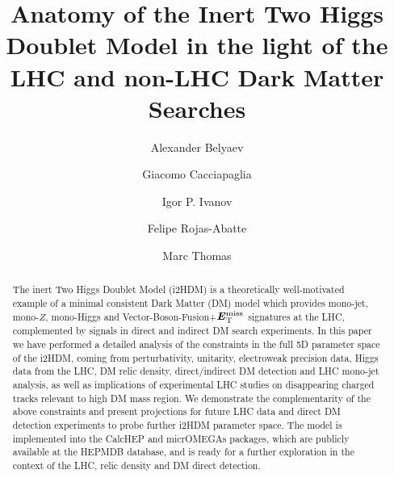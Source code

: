 \documentclass[12pt,a4paper]{article}
\renewcommand{\topfraction}{1.0}
\renewcommand{\bottomfraction}{1.0}
\renewcommand{\textfraction}{0.0}
\newcommand{\MET}{\textbf{\textit{E}$_{\rm T}^{\rm miss}$}}
\begin{document}
\renewcommand{\topfraction}{1.0}
\renewcommand{\bottomfraction}{1.0}
\renewcommand{\textfraction}{0.0}

\title{Anatomy of the Inert Two Higgs Doublet Model in the light of the LHC and non-LHC Dark Matter Searches}

\author[1,2]{Alexander Belyaev}
\author[3]{Giacomo Cacciapaglia}
\author[4]{Igor P. Ivanov}
\author[2,5]{Felipe Rojas-Abatte}
\author[1,2]{Marc Thomas}


\maketitle
\vspace{0.8cm}
\begin{abstract}
The inert Two Higgs Doublet Model (i2HDM) is a theoretically well-motivated  example  of a
minimal consistent Dark Matter (DM)  model  which provides mono-jet, mono-$Z$, mono-Higgs and
Vector-Boson-Fusion+$\MET{}$ signatures at the LHC, complemented by signals in direct and
indirect DM search experiments. In this paper we have performed a detailed analysis of the  
constraints in the full 5D  parameter space of the i2HDM, coming from perturbativity, unitarity, electroweak
precision data, Higgs data from the LHC, DM relic density, direct/indirect DM detection and LHC
mono-jet analysis, as well as  implications of experimental LHC studies on disappearing charged
tracks relevant to high DM mass region. We demonstrate the complementarity of the above
constraints and present projections for future LHC data and direct DM detection
experiments to probe further i2HDM parameter space. The model is implemented into the CalcHEP and
micrOMEGAs packages, which are publicly available at the HEPMDB database, and is ready for a further
exploration in the context of the LHC, relic density and DM direct detection.


\end{abstract}

\newpage
\tableofcontents
\newpage


%
\end{document}
